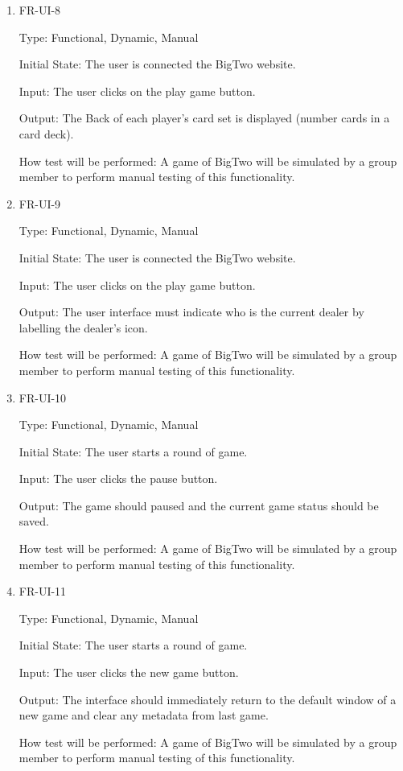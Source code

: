 \documentclass[12pt, titlepage]{article}
\begin{document}
\begin{enumerate}
\item{FR-UI-8\\}

Type: Functional, Dynamic, Manual
					
Initial State: The user is connected the BigTwo website.
					
Input: The user clicks on the play game button.
					
Output: The Back of each player's card set is displayed (number cards in a card deck).
					
How test will be performed: A game of BigTwo will be simulated by a group member to perform manual testing of this functionality.

\item{FR-UI-9\\}

Type: Functional, Dynamic, Manual
					
Initial State: The user is connected the BigTwo website.
					
Input: The user clicks on the play game button.
					
Output: The user interface must indicate who is the current dealer by labelling the dealer's icon.
					
How test will be performed: A game of BigTwo will be simulated by a group member to perform manual testing of this functionality.

\item{FR-UI-10\\}

Type: Functional, Dynamic, Manual
					
Initial State: The user starts a round of game.
					
Input: The user clicks the pause button.
					
Output: The game should paused and the current game status should be saved.
					
How test will be performed: A game of BigTwo will be simulated by a group member to perform manual testing of this functionality.

\item{FR-UI-11\\}

Type: Functional, Dynamic, Manual
					
Initial State: The user starts a round of game.
					
Input: The user clicks the new game button.
					
Output: The interface should immediately return to the default window of a new game and clear any metadata from last game.
					
How test will be performed: A game of BigTwo will be simulated by a group member to perform manual testing of this functionality.


\end{enumerate}
\end{document}
